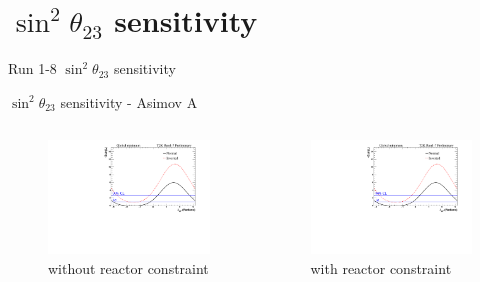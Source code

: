 \documentclass{beamer}
\newcommand{\sinsqthetatwothree}{$\sin^2\theta_{23}$\xspace}
\begin{document}
\section{\sinsqthetatwothree sensitivity}
\begin{frame}
	\centering
	\Large Run 1-8 \sinsqthetatwothree sensitivity\\
\end{frame}

\begin{frame}{\sinsqthetatwothree sensitivity - Asimov A}
	\centering
	\begin{columns}
		\begin{column}{0.5\paperwidth}
			\begin{figure}
				\includegraphics[trim={0cm 0cm 0cm 0cm}, clip, scale=0.33] {images/sensitivity/th23_global_t2k}
				\caption*{without reactor constraint}
			\end{figure}
		\end{column}
		\begin{column}{0.5\paperwidth}
			\begin{figure}
				\includegraphics[trim={0cm 0cm 0cm 0cm}, clip, scale=0.33] {images/sensitivity/th23_global_t2k}
				\caption*{with reactor constraint}
			\end{figure}
		\end{column}
	\end{columns}
\end{frame}
\end{document}

